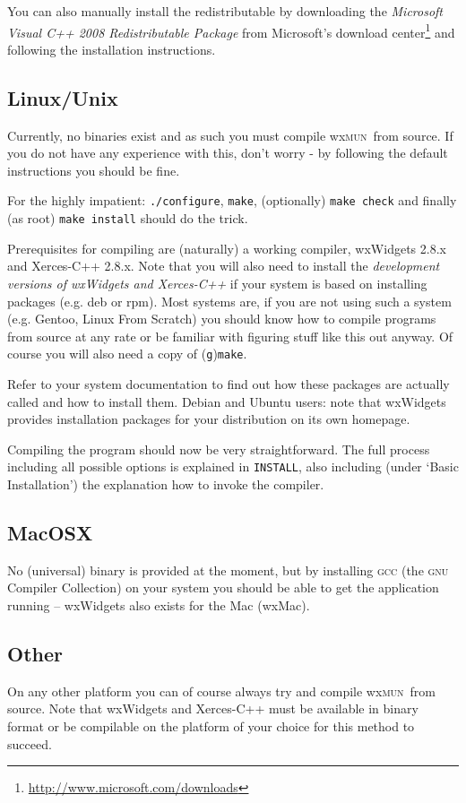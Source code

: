 \documentclass[11pt, a4paper]{article}
\newcommand\wxMUN{wx\textsc{mun}}
\begin{document}
You can also manually install the redistributable by downloading the \emph{Microsoft Visual C++ 2008 Redistributable Package} from Microsoft's download center\footnote{\url{http://www.microsoft.com/downloads}} and following the installation instructions.

\subsection{Linux/Unix}
Currently, no binaries exist and as such you must compile \wxMUN\ from source. If you do not have any experience with this, don't worry - by following the default instructions you should be fine. 

For the highly impatient: \texttt{./configure}, \texttt{make}, (optionally) \texttt{make check} and finally (as root) \texttt{make install} should do the trick.

Prerequisites for compiling are (naturally) a working compiler, wxWidgets 2.8.x and Xerces-C++ 2.8.x. Note that you will also need to install the \emph{development versions of wxWidgets and Xerces-C++} if your system is based on installing packages (e.g. deb or rpm). Most systems are, if you are not using such a system (e.g. Gentoo, Linux From Scratch) you should know how to compile programs from source at any rate or be familiar with figuring stuff like this out anyway. Of course you will also need a copy of (\texttt{g})\texttt{make}.

Refer to your system documentation to find out how these packages are actually called and how to install them. Debian and Ubuntu users: note that wxWidgets provides installation packages for your distribution on its own homepage.

Compiling the program should now be very straightforward. The full process including all possible options is explained in \texttt{INSTALL}, also including (under `Basic Installation') the explanation how to invoke the compiler.

\subsection{MacOSX}
No (universal) binary is provided at the moment, but by installing \textsc{gcc} (the \textsc{gnu} Compiler Collection) on your system you should be able to get the application running -- wxWidgets also exists for the Mac (wxMac).

\subsection{Other}
On any other platform you can of course always try and compile \wxMUN\ from source. Note that wxWidgets and Xerces-C++ must be available in binary format or be compilable on the platform of your choice for this method to succeed.
\end{document}

